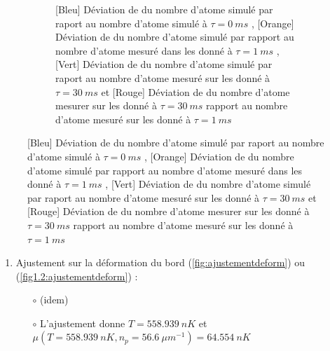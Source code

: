 \documentclass[a3, 10pt,twoside]{article}          %
\theoremstyle{plain}
\theoremstyle{definition}
\theoremstyle{remark}
\theoremstyle{definition} %
\def\OliveGreen{OliveGreen}
\begin{document}
\begin{figure}[H]
\begin{subfigure}[b]{0.45\textwidth}
        		\caption{{\color{blue}[Bleu] Déviation de du nombre d'atome simulé par raport au nombre d'atome simulé à $\tau = 0 ~ms$ } , {\color{orange}[Orange] Déviation de du nombre d'atome simulé par rapport au nombre d'atome mesuré dans les donné à $\tau = 1 ~ms$} ,  {\color{\OliveGreen}[Vert] Déviation de du nombre d'atome simulé par raport au nombre d'atome mesuré sur les donné à $\tau = 30 ~ms$} et {\color{red}[Rouge] Déviation de du nombre d'atome mesurer sur les donné à $\tau = 30 ~ms$ rapport au nombre d'atome mesuré sur les donné à $\tau = 1 ~ms$} }
        		\label{fig1.2:nat}
    		\end{subfigure}
				
		\end{figure}
		
			\begin{enumerate}[label =\Alph*)]
				


				
				\item Ajustement sur la déformation du bord (\ref{fig:ajustementdeform}) ou (\ref{fig1.2:ajustementdeform}) :

					\begin{enumerate}[label =\alph*)]
						\item[$\circ$] (idem)
						\item[$\circ$] L'ajustement donne $T = 558.939 ~nK$ et $\mu( T=558.939 ~nK , n_p = 56.6 ~{\mu m}^{-1} ) = 64.554~nK $ 
					\end{enumerate}
					

\end{enumerate}
\end{document}
